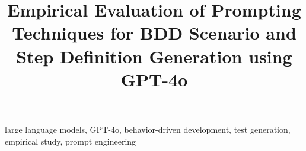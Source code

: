 \documentclass[conference]{IEEEtran}
\begin{document}
\title{Empirical Evaluation of Prompting Techniques for BDD Scenario and Step Definition Generation using GPT-4o}

\author{
}

\maketitle

\begin{abstract}

\end{abstract}

\begin{IEEEkeywords}
large language models, GPT-4o, behavior-driven development, test generation, empirical study, prompt engineering
\end{IEEEkeywords}











\end{document}
